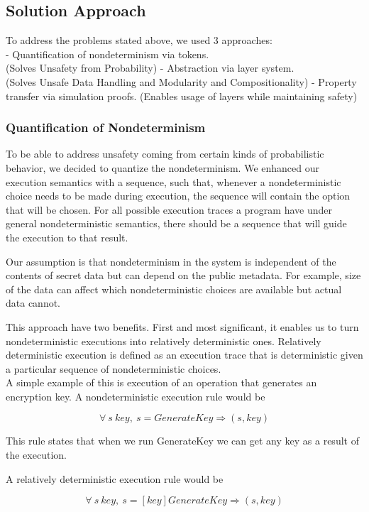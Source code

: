 \subsection*{Solution Approach}
To address the problems stated above, we used 3 approaches:\\
- Quantification of nondeterminism via tokens.\\ (Solves Unsafety from Probability)
- Abstraction via layer system.\\ (Solves Unsafe Data Handling and Modularity and Compositionality)
- Property transfer via simulation proofs. (Enables usage of layers while maintaining safety)


\subsubsection*{Quantification of Nondeterminism}
To be able to address unsafety coming from certain kinds of probabilistic behavior, we decided to quantize the nondeterminism. We enhanced our execution semantics with a sequence, such that, whenever a nondeterministic choice needs to be made during execution, the sequence will contain the option that will be chosen. For all possible execution traces a program have under general nondeterministic semantics, there should be a sequence that will guide the execution to that result. 

Our assumption is that nondeterminism in the system is independent of the contents of secret data but can depend on the public metadata. For example, size of the data can affect which nondeterministic choices are available but actual data cannot.

This approach have two benefits. First and most significant, it enables us to
turn nondeterministic executions into relatively deterministic ones. 
Relatively deterministic execution is defined as an execution trace that is 
deterministic given a particular sequence of nondeterministic choices.\\

A simple example of this is execution of an operation that generates an encryption key. 
A nondeterministic execution rule would be

$$\forall\ s\ key,\ s  =GenerateKey\Rightarrow (s, key)$$ 

This rule states that when we run GenerateKey we can get any key as a result of the execution.

A relatively deterministic execution rule would be

$$\forall\ s\ key,\ s  =[key]GenerateKey\Rightarrow (s, key)$$ 

